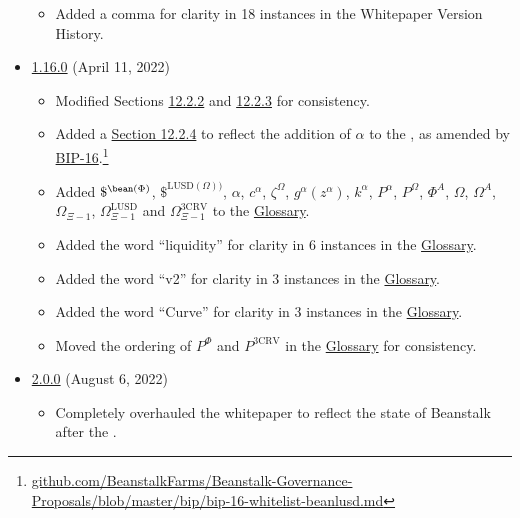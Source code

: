 \documentclass[class=article, crop=false]{standalone}
\begin{document}
\begin{itemize}[topsep=0pt, itemsep=3pt,leftmargin=16pt]
\begin{itemize}
        \item Added a comma for clarity in 18 instances in the Whitepaper Version History.
    \end{itemize}  
        \item \href{https://github.com/BeanstalkFarms/Beanstalk/blob/master/version-history/beanstalk1_16_0.pdf}{1.16.0} (April 11, 2022)
    \begin{itemize}
        \item Modified Sections \hyperlink{subsubsection.12.2.3}{12.2.2} and \hyperlink{subsubsection.12.2.3}{12.2.3} for consistency.
        \item Added a \hyperlink{subsubsection.12.2.4}{Section 12.2.4} to reflect the addition of $\alpha$ to the  , as amended by \href{https://github.com/BeanstalkFarms/Beanstalk-Governance-Proposals/blob/master/bip/bip-16-whitelist-beanlusd.md}{BIP-16}.\footnote{\href{https://github.com/BeanstalkFarms/Beanstalk-Governance-Proposals/blob/master/bip/bip-16-whitelist-beanlusd.md}{github.com/BeanstalkFarms/Beanstalk-Governance-Proposals/blob/master/bip/bip-16-whitelist-beanlusd.md}} 
        \item Added  $\$^{\bean(\Phi)}$, $\$^{\text{LUSD}(\Omega))}$, $\alpha$, $c^{\alpha}$, $\zeta^{\Omega}$, $g^{\alpha}(z^{\alpha})$, $k^{\alpha}$, $P^{\alpha}$, $P^{\Omega}$, $\Phi^{A}$, $\Omega$, $\Omega^{A}$, $\Omega_{\Xi-1}$, $\Omega_{\Xi-1}^{\text{LUSD}}$ and $\Omega_{\Xi-1}^{\text{3CRV}}$ to the \hyperlink{subsection.14.11}{Glossary}. 
        \item Added the word ``liquidity'' for clarity in 6 instances in the \hyperlink{subsection.14.11}{Glossary}.
        \item Added the word ``v2'' for clarity in 3 instances in the \hyperlink{subsection.14.11}{Glossary}.
        \item Added the word ``Curve'' for clarity in 3 instances in the \hyperlink{subsection.14.11}{Glossary}.
        \item Moved the ordering of $P^{\Phi}$ and $P^{\text{3CRV}}$ in the \hyperlink{subsection.14.11}{Glossary} for consistency. 
    \end{itemize}  
        \item \href{https://github.com/BeanstalkFarms/Beanstalk/blob/master/version-history/beanstalk2_0_0.pdf}{2.0.0} (August 6, 2022)
    \begin{itemize}
        \item Completely overhauled the whitepaper to reflect the state of Beanstalk after the .

\end{itemize}
\end{itemize}
\end{document}
